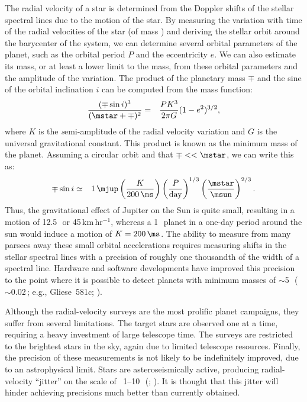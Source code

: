 The radial velocity of a star is determined from the Doppler shifts of the stellar spectral lines due to the motion of the star.
By measuring the variation with time of the radial velocities of the star (of mass \mstar) and deriving the stellar orbit around the barycenter of the system, we can determine several orbital parameters of the planet, such as the orbital period $P$
and the eccentricity $e$.
We can also estimate its mass, or at least a lower limit to the mass, from these orbital parameters and the amplitude of the variation.
The product of the planetary mass $\mp$ and the sine of the orbital inclination $i$ can be computed from the mass function:
\begin{eqnarray*}
\frac{(\mp \sin{i})^3}{(\mstar + \mp)^2} & = %
& \frac{P K^3}{2 \pi G}  (1-e^2)^{3/2}, %
\end{eqnarray*}
where $K$ is the {\textit semi}-amplitude of the radial velocity variation and $G$ is the universal gravitational constant.
This product is known as the minimum mass of the planet.
Assuming a circular orbit and that $\mp << \mstar$, we can write this as:
\begin{eqnarray}
\mp \sin{i} & \simeq & 1\,\mjup \left( \frac{K}{200\,\ms} \right)
    \left( \frac{P}{\mathrm{day}} \right)^{1/3} %
    \left( \frac{\mstar}{\msun} \right)^{2/3}.\label{cha:intro:sec:methods:sub:rv:eqn:mpsini} %
\end{eqnarray}
Thus, the gravitational effect of Jupiter on the Sun is quite small, resulting in a motion of     12.5\,\ms\ or 45\,$\mathrm{km\,hr^{-1}}$, whereas a 1\,\mjup\ planet in a one-day period around the sun would induce a motion of $K=200\,\ms$.
The ability to measure from many parsecs away these small orbital accelerations requires measuring shifts in the stellar spectral lines with a precision of roughly one thousandth of the width of a spectral line.
Hardware and software developments have improved this precision to the point where it is possible to detect planets with minimum masses of $\sim$5\,\mearth\ ($\sim$0.02\,\mjup; e.g., \mbox{Gliese 581c}; \citealp{Udry_Bonfils_Delfosse:aa:2007a}).

Although the radial-velocity surveys are the most prolific planet campaigns, they suffer from several limitations.
The target stars are observed one at a time, requiring a heavy investment of large telescope time.
The surveys are restricted to the brightest stars in the sky, again due to limited telescope resources.
Finally, the precision of these measurements is not likely to be indefinitely improved, due to an astrophysical limit.
Stars are asteroseismically active, producing radial-velocity ``jitter'' on the scale of ~1--10\,\ms\ (\citealp*{Saar_Butler_Marcy:apjl:1998a}; \citealp{Santos_Mayor_Naef:aa:2000a, Wright:pasp:2005a}).%
It is thought that this jitter will hinder achieving precisions much better than currently obtained.

